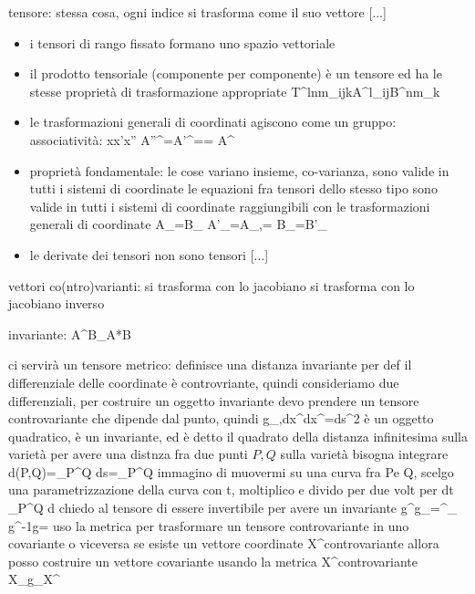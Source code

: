 {{tensore: stessa cosa, ogni indice si trasforma come il suo vettore
[...]

\begin{prop}
	\begin{itemize}
		\item 	i tensori di rango fissato formano uno spazio vettoriale
		\item	il prodotto tensoriale (componente per componente) è un tensore ed ha le stesse proprietà di trasformazione appropriate
			T^{lnm}_{ijk}\equiv A^l_{ij}B^{nm}_k
		\item	le trasformazioni generali di coordinati agiscono come un gruppo:
			associatività: x\to x'\to x''
			A''^\mu=A'^\nu== \pdv{}{}A^\sigma
		\item 	proprietà fondamentale: le cose variano insieme, co-varianza, sono valide in tutti i sistemi di coordinate
		le equazioni fra tensori dello stesso tipo sono valide in tutti	i sistemi di coordinate raggiungibili con le trasformazioni generali di coordinate
			A_{\mu\nu}=B_{\mu\nu}
			A'_{\mu\nu}=A_{\rho,\sigma}= B_{\rho\sigma}=B'_{\mu\nu}
		\item	le derivate dei tensori non sono tensori
			[...]
	\end{itemize}
\end{prop}

vettori co(ntro)varianti: 
	si trasforma con lo jacobiano
	si trasforma con lo jacobiano inverso
	
invariante: A^\mu B_\mu\equiv A*B

ci servirà un tensore metrico: definisce una distanza invariante
per def il differenziale delle coordinate è controvriante, quindi consideriamo due differenziali, per costruire un oggetto invariante devo prendere un tensore controvariante che dipende dal punto, quindi g_{\mu,\nu}dx^\mu dx^\nu=ds^2
è un oggetto quadratico, è un invariante, ed è detto il quadrato della distanza infinitesima sulla varietà
per avere una distnza fra due punti $P,Q$ sulla varietà bisogna integrare
	d(P,Q)=\int_P^Q ds=\int_P^Q \equiv immagino di muovermi su una curva fra Pe Q, scelgo una parametrizzazione della curva con t, moltiplico e divido per due volt per dt
	 \int_P^Q d\tau {}
chiedo al tensore di essere invertibile per avere un invariante
	g^{\alpha\beta}g_{\beta\mu}=\delta^\alpha_\mu
	g^{-1}g=
uso la metrica per trasformare un tensore controvariante in uno covariante o viceversa
se esiste un vettore coordinate X^\alpha controvariante allora posso costruire un vettore covariante usando la metrica
	X^\alpha controvariante \rightarrow X_\beta\equiv g_{\beta\alpha}X^\alpha
	
}}
